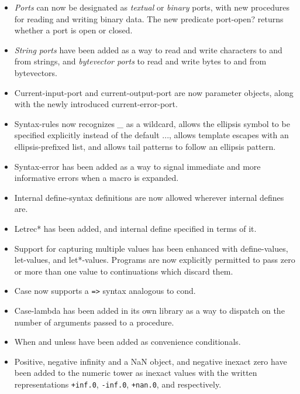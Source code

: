 \begin{itemize}
\item {\em Ports} can now be designated as {\em textual} or {\em
binary} ports, with new procedures for reading and writing binary
data.
The new predicate {\cf port-open?} returns whether a port is open or closed.

\item {\em String ports} have been added as a way to read and write
characters to and from strings, and {\em bytevector ports} to read
and write bytes to and from bytevectors.

\item {\cf Current-input-port} and {\cf current-output-port} are now
parameter objects, along with the newly introduced {\cf
current-error-port}.

\item {\cf Syntax-rules} now recognizes {\em \_} as a wildcard, allows
the ellipsis symbol to be specified explicitly instead of the default
{\cf ...}, allows template escapes with an ellipsis-prefixed list, and
allows tail patterns to follow an ellipsis pattern.

\item {\cf Syntax-error} has been added as a way to signal immediate
and more informative errors when a macro is expanded.

\item Internal {\cf define-syntax} definitions are now allowed wherever
internal {\cf define}s are.

\item {\cf Letrec*} has been added, and internal {\cf define} specified in
terms of it.

\item Support for capturing multiple values has been enhanced with {\cf
define-values}, {\cf let-values}, and {\cf let*-values}.
Programs are now explicitly permitted to pass zero or more than one
value to continuations which discard them.

\item {\cf Case} now supports a {\tt =>} syntax analogous to {\cf cond}.

\item {\cf Case-lambda} has been added in its own library as a way to
dispatch on the number of arguments passed to a procedure.

\item {\cf When} and {\cf unless} have been added as convenience
conditionals.

\item Positive, negative infinity and a NaN object, and negative inexact zero have been added
to the numeric tower as inexact values with the written
representations {\tt +inf.0}, {\tt -inf.0}, {\tt +nan.0}, and {}
respectively.


\end{itemize}
